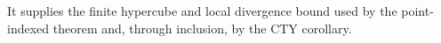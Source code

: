It supplies the finite hypercube and local divergence bound used by the point-indexed theorem and, through inclusion, by the CTY corollary.